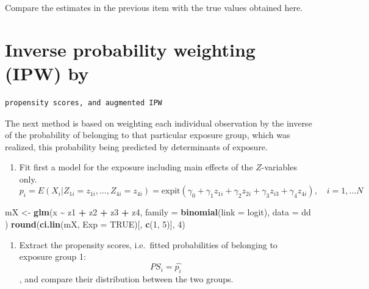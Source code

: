 \documentclass[
]{book}
\newenvironment{Shaded}{\begin{snugshade}}{\end{snugshade}}
\newcommand{\AttributeTok}[1]{\textcolor[rgb]{0.13,0.29,0.53}{#1}}
\newcommand{\ConstantTok}[1]{\textcolor[rgb]{0.56,0.35,0.01}{#1}}
\newcommand{\DecValTok}[1]{\textcolor[rgb]{0.00,0.00,0.81}{#1}}
\newcommand{\FunctionTok}[1]{\textcolor[rgb]{0.13,0.29,0.53}{\textbf{#1}}}
\newcommand{\NormalTok}[1]{#1}
\newcommand{\OtherTok}[1]{\textcolor[rgb]{0.56,0.35,0.01}{#1}}
\newcommand{\SpecialCharTok}[1]{\textcolor[rgb]{0.81,0.36,0.00}{\textbf{#1}}}
\providecommand{\tightlist}{%
  \setlength{\itemsep}{0pt}\setlength{\parskip}{0pt}}
\begin{document}
Compare the estimates in the previous item with the true values
obtained here.

\section{Inverse probability weighting (IPW) by}\label{inverse-probability-weighting-ipw-by}

\begin{verbatim}
propensity scores, and augmented IPW
\end{verbatim}

The next method is based on weighting each individual observation
by the inverse of the probability of belonging to that particular
exposure group, which was realized, this probability being predicted by
determinants of exposure.

\begin{enumerate}
\def\labelenumi{\arabic{enumi}.}
\tightlist
\item
  Fit first a model for the exposure including main effects
  of the \(Z\)-variables only.
  \[ 
  p_i = E(X_i| Z_{1i} = z_{1i}, \dots, Z_{4i} = z_{4i})
  = \text{expit}(\gamma_0 + \gamma_1 z_{1i} + \gamma_2 z_{2i} +
     \gamma_3 z_{i3} + \gamma_4 z_{4i} ), \quad i=1, \dots N 
  \]
\end{enumerate}

\begin{Shaded}
\begin{Highlighting}[]
\NormalTok{mX }\OtherTok{\textless{}{-}} \FunctionTok{glm}\NormalTok{(x }\SpecialCharTok{\textasciitilde{}}\NormalTok{ z1 }\SpecialCharTok{+}\NormalTok{ z2 }\SpecialCharTok{+}\NormalTok{ z3 }\SpecialCharTok{+}\NormalTok{ z4,}
  \AttributeTok{family =} \FunctionTok{binomial}\NormalTok{(}\AttributeTok{link =}\NormalTok{ logit), }\AttributeTok{data =}\NormalTok{ dd}
\NormalTok{)}
\FunctionTok{round}\NormalTok{(}\FunctionTok{ci.lin}\NormalTok{(mX, }\AttributeTok{Exp =} \ConstantTok{TRUE}\NormalTok{)[, }\FunctionTok{c}\NormalTok{(}\DecValTok{1}\NormalTok{, }\DecValTok{5}\NormalTok{)], }\DecValTok{4}\NormalTok{)}
\end{Highlighting}
\end{Shaded}

\begin{enumerate}
\def\labelenumi{\arabic{enumi}.}
\setcounter{enumi}{1}
\tightlist
\item
  Extract the propensity scores, i.e.~fitted
  probabilities of belonging to exposure group 1:
  \[ PS_i = \widehat{p_i} \],
  and compare their distribution between the two groups.
\end{enumerate}
\end{document}
